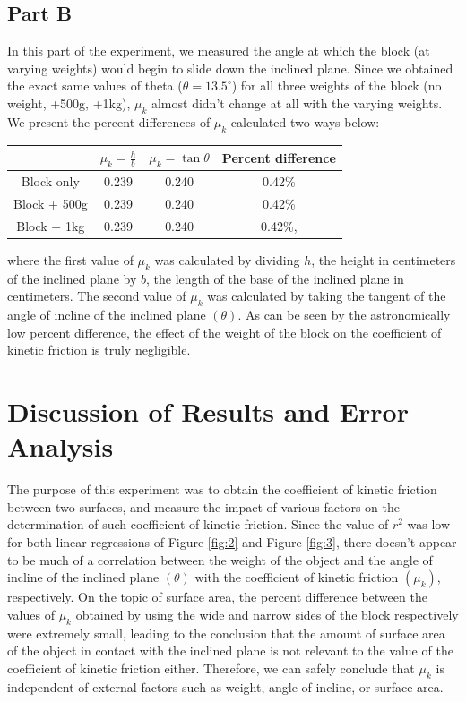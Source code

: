 \documentclass{article}
\theoremstyle{definition}
\begin{document}
\subsection*{Part B}
In this part of the experiment, we measured the angle at which the block (at varying weights)
would begin to slide down the inclined plane. Since we obtained the exact same values of theta 
($\theta = 13.5^\circ$) for all 
three weights of the block (no weight, +500g, +1kg), $\mu_k$ almost didn't change at all
with the varying weights. We present the percent differences of $\mu_k$ calculated two ways below:
\begin{center}
    \begin{tabular}{ c | c c c}
      & $\mu_k = \frac{h}{b}$ & $\mu_k  = \tan\theta$ & Percent difference \\ 
     \hline
     Block only & 0.239 & 0.240 & 0.42\% \\  
     Block + 500g & 0.239 & 0.240 & 0.42\% \\  
     Block + 1kg & 0.239 & 0.240 & 0.42\%,
    \end{tabular}
\end{center}
where the first value of $\mu_k$ was calculated by dividing $h$, the height in centimeters
of the inclined plane by $b$, the length of the base of the inclined plane in centimeters.
The second value of $\mu_k$ was calculated by taking the tangent of the angle of incline 
of the inclined plane $(\theta)$. As can be seen by the astronomically low percent difference, 
the effect of the weight of the block on the coefficient of kinetic friction is truly negligible.
\section{Discussion of Results and Error Analysis}
The purpose of this experiment was to obtain the coefficient of kinetic friction between two
surfaces, and measure the impact of various factors on the determination of such coefficient of 
kinetic friction. Since the value of $r^2$ was low for both linear regressions of Figure \ref{fig:2}
and Figure \ref{fig:3}, there doesn't appear to be much of a correlation between the weight of 
the object and the angle of incline of the inclined plane $(\theta)$ with the coefficient of kinetic friction
$(\mu_k)$, respectively. On the topic of surface area, the percent difference between the values of
$\mu_k$ obtained by using the wide and narrow sides of the block respectively were extremely small, 
leading to the conclusion that the amount of surface area of the object in contact with the inclined plane
is not relevant to the value of the coefficient of kinetic friction either.
Therefore, we can safely conclude that $\mu_k$ is independent of external factors 
such as weight, angle of incline, or surface area. 
\end{document}
